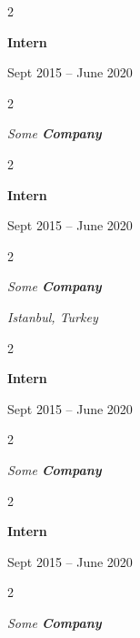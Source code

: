 \documentclass[10pt, letterpaper]{article}
\newenvironment{twocolentry}[2][]{
    \onecolentry
    \def\secondColumn{#2}
    \setcolumnwidth{\fill, 4.5 cm}
    \begin{paracol}{2}
}{
    \switchcolumn \raggedleft \secondColumn
    \end{paracol}
    \endonecolentry
} %
\begin{document}
        \vspace{0.2 cm}

                \begin{twocolentry}{
                    Sept 2015 – June 2020
                }
                \textbf{Intern}
                \end{twocolentry}
            \begin{twocolentry}{
            }
            \textit{Some \textbf{Company}}
            \end{twocolentry}



        \vspace{0.2 cm}

                \begin{twocolentry}{
                    Sept 2015 – June 2020
                }
                \textbf{Intern}
                \end{twocolentry}
            \begin{twocolentry}{
        \textit{Istanbul, Turkey}    }
            \textit{Some \textbf{Company}}
            \end{twocolentry}



        \vspace{0.2 cm}

                \begin{twocolentry}{
                    Sept 2015 – June 2020
                }
                \textbf{Intern}
                \end{twocolentry}
            \begin{twocolentry}{
            }
            \textit{Some \textbf{Company}}
            \end{twocolentry}



        \vspace{0.2 cm}

                \begin{twocolentry}{
                    Sept 2015 – June 2020
                }
                \textbf{Intern}
                \end{twocolentry}
            \begin{twocolentry}{
            }
            \textit{Some \textbf{Company}}
            \end{twocolentry}



        \vspace{0.2 cm}
\end{document}

